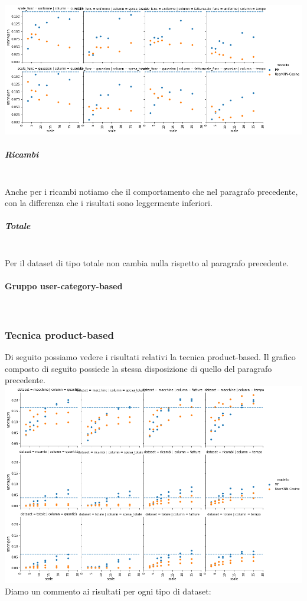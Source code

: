 \includegraphics[width=16cm]{figures/scale_func_ordered_singolo.png}

\subparagraph{Ricambi}\mbox{} \\
Anche per i ricambi notiamo che il comportamento che nel paragrafo precedente, con la differenza che i risultati sono leggermente inferiori.

\subparagraph{Totale}\mbox{} \\
Per il dataset di tipo totale non cambia nulla rispetto al paragrafo precedente.

\paragraph{Gruppo user-category-based}\mbox{} \\

\subsubsection{Tecnica product-based}
Di seguito possiamo vedere i risultati relativi la tecnica product-based.
Il grafico composto di seguito possiede la stessa disposizione di quello del paragrafo precedente.\\
\includegraphics[width=16cm]{figures/prodotto.png}
Diamo un commento ai risultati per ogni tipo di dataset:\\

